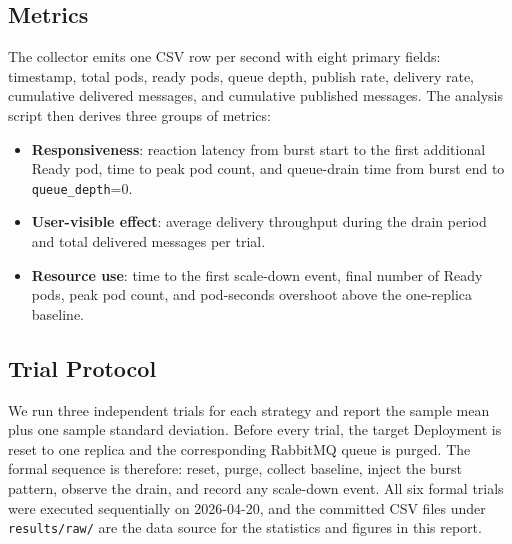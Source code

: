 \subsection{Metrics}
\label{subsec:metrics}
The collector emits one CSV row per second with eight primary fields: timestamp, total pods, ready pods, queue depth, publish rate, delivery rate, cumulative delivered messages, and cumulative published messages. The analysis script then derives three groups of metrics:
\begin{itemize}
  \item \textbf{Responsiveness}: reaction latency from burst start to the first additional Ready pod, time to peak pod count, and queue-drain time from burst end to \texttt{queue\_depth}=0.
  \item \textbf{User-visible effect}: average delivery throughput during the drain period and total delivered messages per trial.
  \item \textbf{Resource use}: time to the first scale-down event, final number of Ready pods, peak pod count, and pod-seconds overshoot above the one-replica baseline.
\end{itemize}

\subsection{Trial Protocol}
\label{subsec:protocol}
We run three independent trials for each strategy and report the sample mean plus one sample standard deviation. Before every trial, the target Deployment is reset to one replica and the corresponding RabbitMQ queue is purged. The formal sequence is therefore: reset, purge, collect baseline, inject the burst pattern, observe the drain, and record any scale-down event. All six formal trials were executed sequentially on 2026-04-20, and the committed CSV files under \texttt{results/raw/} are the data source for the statistics and figures in this report.
